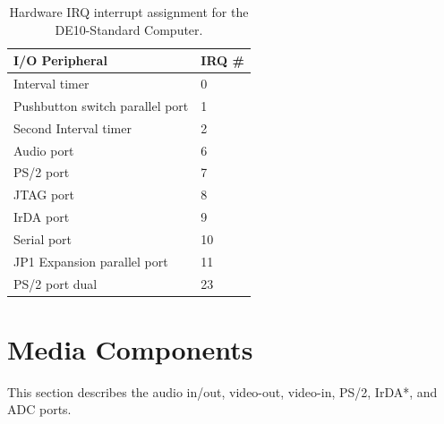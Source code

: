 \documentclass[11pt, twoside, pdftex]{article}
\newcommand{\commonFiles}{../../../common/doc}
\newcommand{\systemName}{DE10-Standard Computer}
\begin{document}


\begin{table}[h]
    \begin{center}
    \begin{tabular}{l|l}
            \textbf{I/O Peripheral} &
            \textbf{IRQ \#}
        \\\hline
            Interval timer & 0
        \\
            Pushbutton switch parallel port & 1
        \\
            Second Interval timer & 2
        \\
            Audio port & 6
        \\
            PS/2 port & 7
        \\
            JTAG port & 8
				\\
						IrDA port & 9
        \\
            Serial port & 10
        \\
            JP1 Expansion parallel port & 11
        \\
						PS/2 port dual & 23
				\\
    \end{tabular}
    \caption{Hardware IRQ interrupt assignment for the \systemName.}
	 \label{tab:irq}
    \end{center}
\end{table}
\newpage









\section{Media Components}
\label{sec:multi}

This section describes the audio in/out, video-out, video-in, PS/2, IrDA*, and ADC ports.









\end{document}
